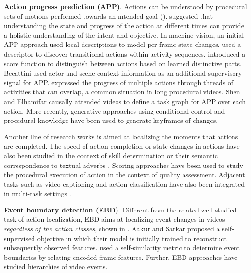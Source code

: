 \noindent
\textbf{Action progress prediction (APP)}. Actions can be understood by procedural sets of motions performed towards an intended goal (). \citet{vaina1991object} suggested that understanding the state and progress of the action at different times can provide a holistic understanding of the intent and objective. In machine vision, an initial APP approach \citep{fathi2013modeling} used local descriptions to model per-frame state changes. \citep{kataoka2016recognition} used a descriptor to discover transitional actions within activity sequences. \citet{xiong2017pursuit} introduced a score function to distinguish between actions based on learned distinctive parts. Becattini \citep{becattini2020done} used actor and scene context information as an additional supervisory signal for APP. \citet{price2022unweavenet} expressed the progress of multiple actions through threads of activities that can overlap, a common situation in long procedural videos. Shen and Elhamifar \citep{shen2024progress} causally attended videos to define a task graph for APP over each action. More recently, generative approaches \citep{damen2024genhowto} using conditional control \citep{zhang2023adding} and procedural knowledge \citep{ashutosh2023video,zhou2023procedure} have been used to generate keyframes of changes. 

Another line of research works \citep{heidarivincheh2016beyond,heidarivincheh2018action} is aimed at localizing the moments that actions are completed. The speed of action completion or state changes in actions have also been studied in the context of skill determination \citep{doughty2018s} or their semantic correspondence to textual adverbs \citep{doughty2020action,doughty2022you,moltisanti2023learning}. Scoring approaches \citep{tang2020uncertainty} have been used to study the procedural execution of action in the context of quality assessment. Adjacent tasks such as video captioning and action classification have also been integrated in multi-task settings \citep{parmar2019and}.


\noindent
\textbf{Event boundary detection (EBD)}. Different from the related well-studied task of action localization, EBD \citep{shou2021generic} aims at localizing event changes in videos \emph{regardless of the action classes}, shown in . Aakur and Sarkar \citep{aakur2019perceptual} proposed a self-supervised objective in which their model is initially trained to reconstruct subsequently observed features. \citep{shou2021generic} used a self-similarity metric to determine event boundaries by relating encoded frame features. Further, EBD approaches \citep{mounir2023streamer} have studied hierarchies of  video events.

